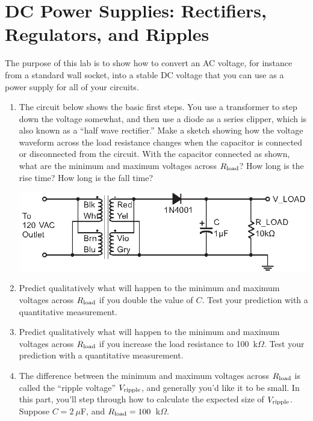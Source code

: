 \section{DC Power Supplies: Rectifiers, Regulators, and Ripples}
\label{lab_power_supply}


\bigskip

The purpose of this lab is to show how to convert an AC voltage, for instance from a standard wall socket, into a stable DC voltage that you can use as a power supply for all of your circuits.

\begin{enumerate}[wide]

\item The circuit below shows the basic first steps.  You use a transformer to step down the voltage somewhat, and then use a diode as a series clipper, which is also known as a ``half wave rectifier.''  Make a sketch showing how the voltage waveform across the load resistance  changes when the capacitor is connected or disconnected from the circuit.  With the capacitor connected as shown, what are the minimum and maximum voltages across $R_{\rm load}$?  How long is the rise time?  How long is the fall time?
\begin{center}
\includegraphics{power_supply/half_wave_rectifier.eps}
\end{center}

\item Predict qualitatively what will happen to the minimum and maximum voltages across $R_{\rm load}$ if you double the value of $C$.  Test your prediction with a quantitative measurement.  

\item Predict qualitatively what will happen to the minimum and maximum voltages across $R_{\rm load}$ if you increase the load resistance to 100~k$\Omega$.  Test your prediction with a quantitative measurement. \label{part_ripple_measured}

\item The difference between the minimum and maximum voltages across $R_{\rm load}$ is called the ``ripple voltage'' $V_{\rm ripple}$, and generally you'd like it to be small.  In this part, you'll step through how to calculate the expected size of $V_{\rm ripple}$.  Suppose $C = 2~\mu$F, and $R_{\rm load}= 100$~k$\Omega$. \label{part_ripple_defined}


\end{enumerate}
